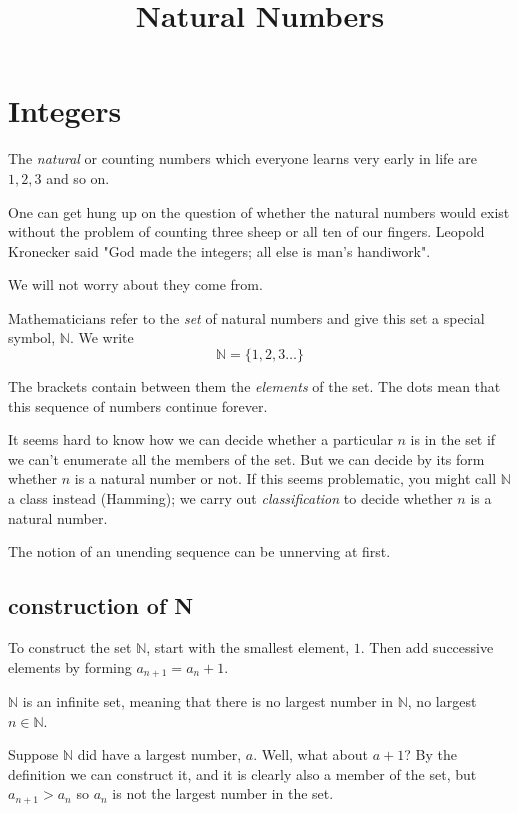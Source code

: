 \documentclass[11pt, oneside]{article}
\title{Natural Numbers}
\date{}
\begin{document}
\maketitle
\Large
\section*{Integers}

The \emph{natural} or counting numbers which everyone learns very early in life are $1, 2, 3$ and so on.

One can get hung up on the question of whether the natural numbers would exist without the problem of counting three sheep or all ten of our fingers.  Leopold Kronecker said "God made the integers; all else is man's handiwork".

We will not worry about they come from.

Mathematicians refer to the \emph{set} of natural numbers and give this set a special symbol, $\mathbb{N}$.  We write
\[ \mathbb{N} = \{ 1, 2, 3 \dots \} \]

The brackets contain between them the \emph{elements} of the set. The dots mean that this sequence of numbers continue forever.

It seems hard to know how we can decide whether a particular $n$ is in the set if we can't enumerate all the members of the set.  But we can decide by its form whether $n$ is a natural number or not.  If this seems problematic, you might call $\mathbb{N}$ a class instead (Hamming);  we carry out \emph{classification} to decide whether $n$ is a natural number.

The notion of an unending sequence can be unnerving at first.

\subsection*{construction of N}

To construct the set $\mathbb{N}$, start with the smallest element, $1$.  Then add successive elements by forming $a_{n+1} = a_n + 1$.

$\mathbb{N}$ is an infinite set, meaning that there is no largest number in $\mathbb{N}$, no largest $n \in \mathbb{N}$.

Suppose $\mathbb{N}$ did have a largest number, $a$.  Well, what about $a + 1$?  By the definition we can construct it, and it is clearly also a member of the set, but $a_{n+1} > a_n$ so $a_n$ is not the largest number in the set.
\end{document}

